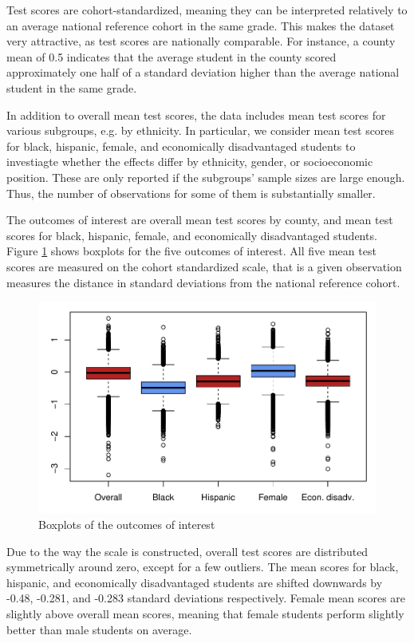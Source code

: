 Test scores are cohort-standardized, meaning they can be interpreted relatively to an average national reference cohort in the same grade. This makes the dataset very attractive, as test scores are nationally comparable. For instance, a county mean of 0.5 indicates that the average student in the county scored approximately one half of a standard deviation higher than the average national student in the same grade.

In addition to overall mean test scores, the data includes mean test scores for various subgroups, e.g. by ethnicity. In particular, we consider mean test scores for black, hispanic, female, and economically disadvantaged students to investiagte whether the effects differ by ethnicity, gender, or socioeconomic position. These are only reported if the subgroups' sample sizes are large enough. Thus, the number of observations for some of them is substantially smaller.

The outcomes of interest are overall mean test scores by county, and mean test scores for black, hispanic, female, and economically disadvantaged students. Figure \ref{DepVarsBoxplot} shows boxplots for the five outcomes of interest. All five mean test scores are measured on the cohort standardized scale, that is a given observation measures the distance in standard deviations from the national reference cohort. 

\begin{figure}[!h]
	\centering
	\includegraphics[scale=1]{"../Code & Data/DepVarsBoxplot.pdf"}
	\caption{Boxplots of the outcomes of interest}
	\label{DepVarsBoxplot}
\end{figure}

Due to the way the scale is constructed, overall test scores are distributed symmetrically around zero, except for a few outliers. The mean scores for black, hispanic, and economically disadvantaged students are shifted downwards by -0.48, -0.281, and -0.283 standard deviations respectively. Female mean scores are slightly above overall mean scores, meaning that female students perform slightly better than male students on average.

